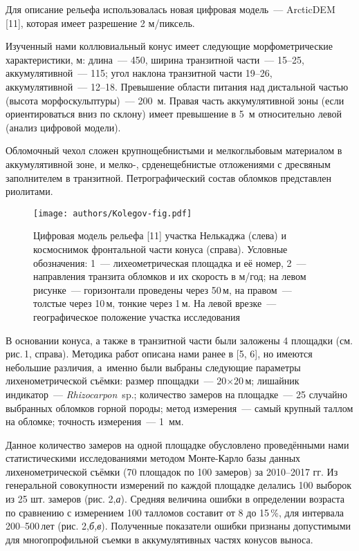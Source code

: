 Для описание рельефа использовалась новая цифровая модель~--- ArcticDEM [11], которая имеет разрешение 2 м/пиксель.

Изученный нами коллювиальный конус имеет следующие морфометрические характеристики, м: длина~---  450, ширина транзитной части~---  15--25, аккумулятивной~--- 115; угол наклона транзитной части 19--26\dg, аккумулятивной~--- 12--18\dg. Превышение области питания над дистальной частью (высота морфоскульптуры)~--- 200~м. Правая часть аккумулятивной зоны (если ориентироваться вниз по склону) имеет превышение в 5~м относительно левой (анализ цифровой модели).

Обломочный чехол сложен крупнощебнистыми и мелкоглыбовым материалом в аккумулятивной зоне, и мелко-, срденещебнистые отложениями с дресвяным заполнителем в транзитной. Петрографический состав обломков представлен риолитами.

\begin{figure}[H]
  \centering
  \texttt{[image: authors/Kolegov-fig.pdf]}
  \caption{Цифровая модель рельефа [11] участка Нелькаджа (слева) и космоснимок фронтальной части конуса (справа). Условные обозначения: 1~--- лихеометрическая площадка и её номер, 2~--- направления транзита обломков и их скорость в м/год; на левом рисунке~--- горизонтали проведены через 50\,м, на правом~--- толстые через 10\,м, тонкие через 1\,м. На левой врезке~--- географическое положение участка исследования}
  \label{fig:kolegov-fig}
\end{figure}

В основании конуса, а также в транзитной части были заложены 4 площадки (см. рис.\,1, справа). Методика работ описана нами ранее в [5, 6], но имеются небольшие различия, а~именно были выбраны следующие параметры лихенометрической съёмки:  размер ппощадки~--- 20$\times$20\,м; лишайник индикатор~--- \textit{Rhizocarpon}~sp.; количество замеров на площадке~--- 25 случайно выбранных обломков горной породы; метод измерения~--- самый крупный таллом на обломке; точность измерения~--- 1~мм.

Данное количество замеров на одной площадке обусловлено проведёнными нами статистическими исследованиями методом Монте-Карло базы данных лихенометрической съёмки (70 площадок по 100 замеров) за 2010--2017 гг. Из генеральной совокупности измерений по каждой площадке делались 100 выборок из 25 шт. замеров (рис. 2,\textit{а}). Средняя величина ошибки в определении возраста по сравнению с измерением 100 талломов составит от 8 до 15\,\%, для интервала 200--500\,лет (рис. 2,\textit{б,в}).  Полученные показатели ошибки признаны допустимыми для многопрофильной съемки в аккумулятивных частях конусов выноса.



